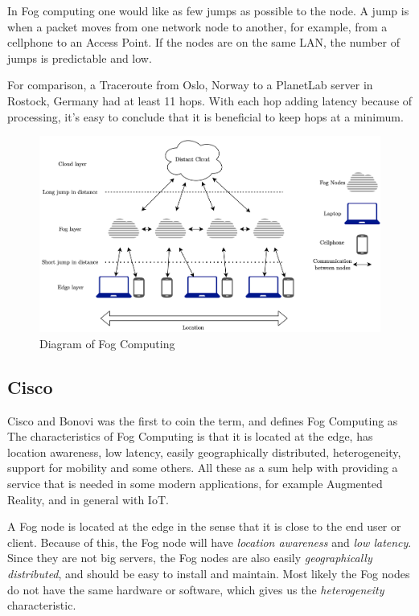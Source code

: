 In Fog computing one would like as few jumps as possible to the node. A jump is when a packet moves from one network node to another, for example, from a cellphone to an Access Point. If the nodes are on the same LAN, the number of jumps is predictable and low.

For comparison, a Traceroute\cite{noauthor_traceroute68_nodate} from Oslo, Norway to a PlanetLab server in Rostock, Germany had at least 11 hops. With each hop adding latency because of processing, it’s easy to conclude that it is beneficial to keep hops at a minimum.

\begin{figure}[t]
    \centering
    \includegraphics[scale=0.6]{chapters/2_background/figures/Fog.png}
    \caption{Diagram of Fog Computing}
    \label{fig:FogDiagram}
\end{figure}

\subsection{Cisco}
Cisco\cite{bonomi_fog_nodate} and Bonovi was the first to coin the term, and defines Fog Computing as   The characteristics of Fog Computing is that it is located at the edge, has location awareness, low latency, easily geographically distributed, heterogeneity, support for mobility and some others. All these as a sum help with providing a service that is needed in some modern applications, for example Augmented Reality, and in general with IoT.

A Fog node is located at the edge in the sense that it is close to the end user or client. Because of this, the Fog node will have \textit{location awareness} and \textit{low latency}. Since they are not big servers, the Fog nodes are also easily \textit{geographically distributed}, and should be easy to install and maintain. Most likely the Fog nodes do not have the same hardware or software, which gives us the \textit{heterogeneity} characteristic. 

